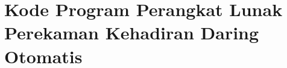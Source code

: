 \chapter{Kode Program Perangkat Lunak Perekaman Kehadiran Daring Otomatis}
\label{lamp:B}

%
%
%

 

